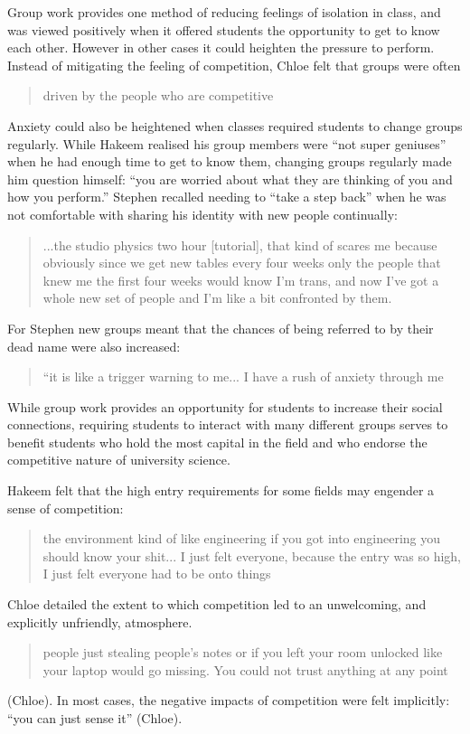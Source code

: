 Group work provides one method of reducing feelings of isolation in class, and was viewed positively when it offered students the opportunity to get to know each other. However in other cases it could heighten the pressure to perform. Instead of mitigating the feeling of competition, Chloe felt that groups were often \blockquote{driven by the people who are competitive}. Anxiety could also be heightened when classes required students to change groups regularly. While Hakeem realised his group members were ``not super geniuses'' when he had enough time to get to know them, changing groups regularly made him question himself: ``you are worried about what they are thinking of you and how you perform.'' Stephen recalled needing to ``take a step back'' when he was not comfortable with sharing his identity with new people continually: \blockquote{...the studio physics two hour [tutorial], that kind of scares me because obviously since we get new tables every four weeks only the people that knew me the first four weeks would know I'm trans, and now I've got a whole new set of people and I’m like a bit confronted by them.} For Stephen new groups meant that the chances of being referred to by their dead name were also increased: \blockquote{``it is like a trigger warning to me... I have a rush of anxiety through me} While group work provides an opportunity for students to increase their social connections, requiring students to interact with many different groups serves to benefit students who hold the most capital in the field and who endorse the competitive nature of university science. 

Hakeem felt that the high entry requirements for some fields may engender a sense of competition: \blockquote{the environment kind of like engineering if you got into engineering you should know your shit... I just felt everyone, because the entry was so high, I just felt everyone had to be onto things} Chloe detailed the extent to which competition led to an unwelcoming, and explicitly unfriendly, atmosphere. \blockquote{people just stealing people’s notes or if you left your room unlocked like your laptop would go missing. You could not trust anything at any point} (Chloe). In most cases, the negative impacts of competition were felt implicitly: ``you can just sense it'' (Chloe). 




